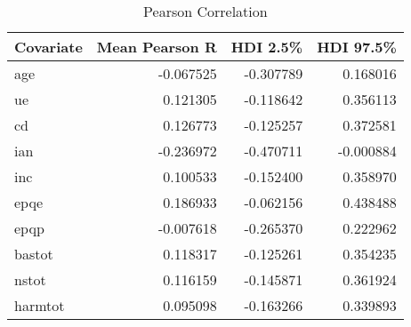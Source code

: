 \begin{table}[h!]
\centering
\caption{Pearson Correlation}
\label{Correlation}
    \begin{tabular}{lrrr}
    \toprule
    Covariate &  Mean Pearson R &  HDI 2.5\% &  HDI 97.5\% \\
    \midrule
          age &       -0.067525 & -0.307789 &   0.168016 \\
           ue &        0.121305 & -0.118642 &   0.356113 \\
           cd &        0.126773 & -0.125257 &   0.372581 \\
          ian &       -0.236972 & -0.470711 &  -0.000884 \\
          inc &        0.100533 & -0.152400 &   0.358970 \\
         epqe &        0.186933 & -0.062156 &   0.438488 \\
         epqp &       -0.007618 & -0.265370 &   0.222962 \\
       bastot &        0.118317 & -0.125261 &   0.354235 \\
        nstot &        0.116159 & -0.145871 &   0.361924 \\
      harmtot &        0.095098 & -0.163266 &   0.339893 \\
    \bottomrule
    \end{tabular}
\end{table}


